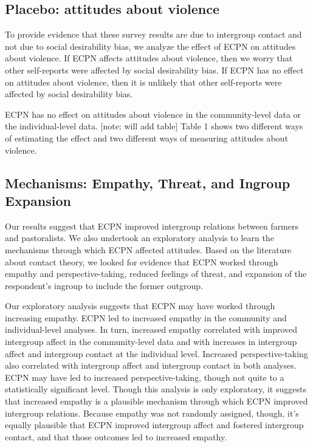 \documentclass[11pt]{article}
\begin{document}
\hypertarget{placebo-attitudes-about-violence}{%
\subsection{Placebo: attitudes about
violence}\label{placebo-attitudes-about-violence}}

To provide evidence that these survey results are due to intergroup
contact and not due to social desirability bias, we analyze the effect
of ECPN on attitudes about violence. If ECPN affects attitudes about
violence, then we worry that other self-reports were affected by social
desirability bias. If ECPN has no effect on attitudes about violence,
then it is unlikely that other self-reports were affected by social
desirability bias.

ECPN has no effect on attitudes about violence in the community-level
data or the individual-level data. {[}note: will add table{]} Table 1
shows two different ways of estimating the effect and two different ways
of measuring attitudes about violence.

\hypertarget{mechanisms-empathy-threat-and-ingroup-expansion}{%
\subsection{Mechanisms: Empathy, Threat, and Ingroup
Expansion}\label{mechanisms-empathy-threat-and-ingroup-expansion}}

Our results suggest that ECPN improved intergroup relations between
farmers and pastoralists. We also undertook an exploratory analysis to
learn the mechanisms through which ECPN affected attitudes. Based on the
literature about contact theory, we looked for evidence that ECPN worked
through empathy and perspective-taking, reduced feelings of threat, and
expansion of the respondent's ingroup to include the former outgroup.

Our exploratory analysis suggests that ECPN may have worked through
increasing empathy. ECPN led to increased empathy in the community and
individual-level analyses. In turn, increased empathy correlated with
improved intergroup affect in the community-level data and with
increases in intergroup affect and intergroup contact at the individual
level. Increased perspective-taking also correlated with intergroup
affect and intergroup contact in both analyses. ECPN may have led to
increased perspective-taking, though not quite to a statistically
significant level. Though this analysis is only exploratory, it suggests
that increased empathy is a plausible mechanism through which ECPN
improved intergroup relations. Because empathy was not randomly
assigned, though, it's equally plausible that ECPN improved intergroup
affect and fostered intergroup contact, and that those outcomes led to
increased empathy.
\end{document}
